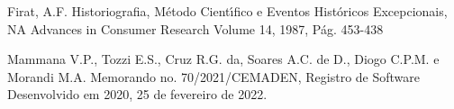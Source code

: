 \documentclass[
12pt,		%
openright,	%
twoside,  %
a4paper,			%
chapter=TITLE,		%
english,			%
french,				%
spanish,			%
brazil				%
]{USPSC-classe/USPSC_RedarTex}
\begin{document}
\begin{flushleft}
\begin{flushleft}
\begin{flushleft}
\begin{flushleft}
\begin{flushleft}
\begin{flushleft}
\begin{flushleft}
\begin{flushleft}
[Firat, 1987] Firat, A.F. Historiografia, M\'etodo Cient\'{\i}fico e Eventos Hist\'oricos Excepcionais, NA Advances in Consumer Research Volume 14, 1987, P\'ag. 453-438
\end{flushleft}


\end{flushleft}


\end{flushleft}


\end{flushleft}


\end{flushleft}


\end{flushleft}


\end{flushleft}


\end{flushleft}


\begin{flushleft}
\begin{flushleft}
\begin{flushleft}
\begin{flushleft}
\begin{flushleft}
\begin{flushleft}
\begin{flushleft}
\begin{flushleft}
[MAMMANA et al., 2022] Mammana V.P., Tozzi E.S., Cruz R.G. da, Soares A.C. de D., Diogo C.P.M. e Morandi M.A. Memorando no. 70/2021/CEMADEN, Registro de Software Desenvolvido em 2020, 25 de fevereiro de 2022.
\end{flushleft}


\end{flushleft}


\end{flushleft}


\end{flushleft}


\end{flushleft}


\end{flushleft}


\end{flushleft}


\end{flushleft}
\end{document}
